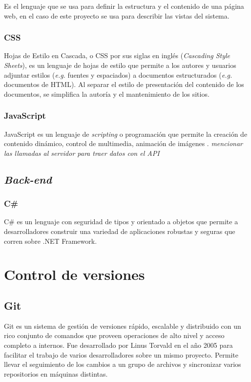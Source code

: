 Es el lenguaje que se usa para definir la estructura y el contenido de una página web, en el caso de este proyecto se usa para describir las vistas del sistema.

\subsubsection{CSS}
Hojas de Estilo en Cascada, o CSS por sus siglas en inglés (\textit{Cascading Style Sheets}), es un lenguaje de hojas de estilo que permite a los autores y usuarios adjuntar estilos (\textit{e.g.} fuentes y espaciados) a documentos estructurados (\textit{e.g.} documentos de HTML). Al separar el estilo de presentación del contenido de los documentos, se simplifica la autoría y el mantenimiento de los sitios. \cite{cssW3C}

\subsubsection{JavaScript}
JavaScript es un lenguaje de \textit{scripting} o programación que permite la creación de contenido dinámico, control de multimedia, animación de imágenes \cite{jsMozilla}. \emph{mencionar las llamadas al servidor para traer datos con el API}


\subsection{\emph{Back-end}}
\subsubsection{C\#}
C\# es un lenguaje con seguridad de tipos y orientado a objetos que permite a desarrolladores construir una variedad de aplicaciones robustas y seguras que corren sobre .NET Framework. \cite{cSharpMicrosoft}

\section{Control de versiones}
\subsection{Git}
Git es un sistema de gestión de versiones rápido, escalable y distribuido con un rico conjunto de comandos que proveen operaciones de alto nivel y acceso completo a internos. \cite{gitGit} Fue desarrollado por Linus Torvald en el año 2005 para facilitar el trabajo de varios desarrolladores sobre un mismo proyecto. Permite llevar el seguimiento de los cambios a un grupo de archivos y sincronizar varios repositorios en máquinas distintas.

